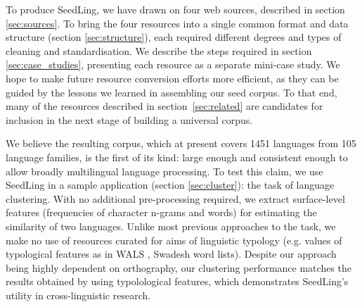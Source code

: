 To produce SeedLing, we have drawn on four web sources, described in section \ref{sec:sources}. To bring the four resources into a single common format and data structure (section \ref{sec:structure}), each required different degrees and types of cleaning and standardisation. We describe the steps required in section \ref{sec:case_studies}, presenting each resource as a separate mini-case study. We hope to make future resource conversion efforts more efficient, as they can be guided by the lessons we learned in assembling our seed corpus. To that end, many of the resources described in section~\ref{sec:related} are candidates for inclusion in the next stage of building a universal corpus.

We believe the resulting corpus, which at present covers 1451 languages from 105 language families, is the first of its kind: large enough and consistent enough to allow broadly multilingual language processing. To test this claim, we use SeedLing in a sample application (section \ref{sec:cluster}): the task of language clustering. With no additional pre-processing required, we extract surface-level features (frequencies of character n-grams and words) for estimating the similarity of two languages. Unlike most previous approaches to the task, we make no use of resources curated for aims of linguistic typology (e.g. values of typological features as in WALS \cite{wals}, Swadesh word lists). Despite our approach being highly dependent on orthography, our clustering performance matches the results obtained by  using typolological features, which demonstrates SeedLing's utility in cross-linguistic research. 





